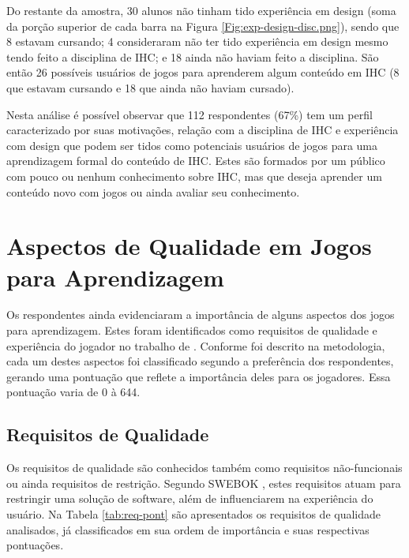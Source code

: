 Do restante da amostra, 30 alunos não tinham tido experiência em design (soma da porção superior de cada barra na Figura \ref{Fig:exp-design-disc.png}), sendo que 8 estavam cursando; 4 consideraram não ter tido experiência em design mesmo tendo feito a disciplina de IHC; e 18 ainda não haviam feito a disciplina. São então 26 possíveis usuários de jogos para aprenderem algum conteúdo em IHC (8 que estavam cursando e 18 que ainda não haviam cursado).

Nesta análise é possível observar que 112 respondentes (67\%) tem um perfil caracterizado por suas motivações, relação com a disciplina de IHC e experiência com design que podem ser tidos como potenciais usuários de jogos para uma aprendizagem formal do conteúdo de IHC. Estes são formados por um público com pouco ou nenhum conhecimento sobre IHC, mas que deseja aprender um conteúdo novo com jogos ou ainda avaliar seu conhecimento. 

\section{Aspectos de Qualidade em Jogos para Aprendizagem}

Os respondentes ainda evidenciaram a importância de alguns aspectos dos jogos para aprendizagem. Estes foram identificados como requisitos de qualidade e experiência do jogador no trabalho de \cite{silva_sales_mendes2021}. Conforme foi descrito na metodologia, cada um destes aspectos foi classificado segundo a preferência dos respondentes, gerando uma pontuação que reflete a importância deles para os jogadores. Essa pontuação varia de 0 à 644.


\subsection{Requisitos de Qualidade}
Os requisitos de qualidade são conhecidos também como requisitos não-funcionais ou ainda requisitos de restrição. Segundo SWEBOK \cite{swebok2014}, estes requisitos atuam para restringir uma solução de software, além de influenciarem na experiência do usuário. Na Tabela \ref{tab:req-pont} são apresentados os requisitos de qualidade analisados, já classificados em sua ordem de importância e suas respectivas pontuações.%



